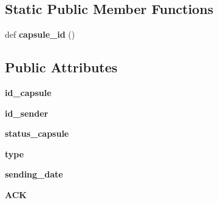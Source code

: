 \subsection*{Static Public Member Functions}
\begin{DoxyCompactItemize}
\item 
\hypertarget{classorg_1_1swallow__labs_1_1model_1_1_capsule_1_1_capsule_a92550b75f8c6df61555ae003a46209e4}{}def {\bfseries capsule\+\_\+id} ()\label{classorg_1_1swallow__labs_1_1model_1_1_capsule_1_1_capsule_a92550b75f8c6df61555ae003a46209e4}

\end{DoxyCompactItemize}
\subsection*{Public Attributes}
\begin{DoxyCompactItemize}
\item 
\hypertarget{classorg_1_1swallow__labs_1_1model_1_1_capsule_1_1_capsule_a0d70a26af63e5442cba26d47d8db99de}{}{\bfseries id\+\_\+capsule}\label{classorg_1_1swallow__labs_1_1model_1_1_capsule_1_1_capsule_a0d70a26af63e5442cba26d47d8db99de}

\item 
\hypertarget{classorg_1_1swallow__labs_1_1model_1_1_capsule_1_1_capsule_a8fd5fae5583b531350c9f3fc041bba1a}{}{\bfseries id\+\_\+sender}\label{classorg_1_1swallow__labs_1_1model_1_1_capsule_1_1_capsule_a8fd5fae5583b531350c9f3fc041bba1a}

\item 
\hypertarget{classorg_1_1swallow__labs_1_1model_1_1_capsule_1_1_capsule_a528b698181018c0cbd08a0979d4728e1}{}{\bfseries status\+\_\+capsule}\label{classorg_1_1swallow__labs_1_1model_1_1_capsule_1_1_capsule_a528b698181018c0cbd08a0979d4728e1}

\item 
\hypertarget{classorg_1_1swallow__labs_1_1model_1_1_capsule_1_1_capsule_aed9abad78f00038e60e379dcf16a1e83}{}{\bfseries type}\label{classorg_1_1swallow__labs_1_1model_1_1_capsule_1_1_capsule_aed9abad78f00038e60e379dcf16a1e83}

\item 
\hypertarget{classorg_1_1swallow__labs_1_1model_1_1_capsule_1_1_capsule_ab23e955752bc3568b2ba74b924b34499}{}{\bfseries sending\+\_\+date}\label{classorg_1_1swallow__labs_1_1model_1_1_capsule_1_1_capsule_ab23e955752bc3568b2ba74b924b34499}

\item 
\hypertarget{classorg_1_1swallow__labs_1_1model_1_1_capsule_1_1_capsule_a93ee9f98f7900d9a599d71582f473f18}{}{\bfseries A\+C\+K}\label{classorg_1_1swallow__labs_1_1model_1_1_capsule_1_1_capsule_a93ee9f98f7900d9a599d71582f473f18}


\end{DoxyCompactItemize}

